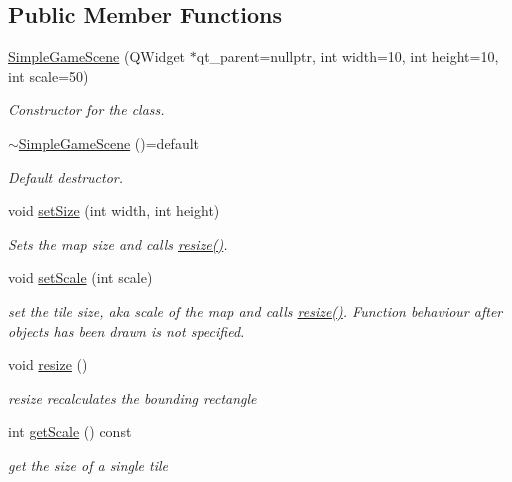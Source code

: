 \subsection*{Public Member Functions}
\begin{DoxyCompactItemize}
\item 
\hyperlink{classCourse_1_1SimpleGameScene_ae65dfd293c3490dcbb71d7a71ddda65b}{Simple\-Game\-Scene} (Q\-Widget $\ast$qt\-\_\-parent=nullptr, int width=10, int height=10, int scale=50)
\begin{DoxyCompactList}\small\item\em Constructor for the class. \end{DoxyCompactList}\item 
\hyperlink{classCourse_1_1SimpleGameScene_ab8addb19d78f539947e163d7ec37e49c}{$\sim$\-Simple\-Game\-Scene} ()=default
\begin{DoxyCompactList}\small\item\em Default destructor. \end{DoxyCompactList}\item 
void \hyperlink{classCourse_1_1SimpleGameScene_a418450a3659d632ff3ba0696ffe88adc}{set\-Size} (int width, int height)
\begin{DoxyCompactList}\small\item\em Sets the map size and calls \hyperlink{classCourse_1_1SimpleGameScene_a2a097ef678bc2eaabe93832917d2aedf}{resize()}. \end{DoxyCompactList}\item 
void \hyperlink{classCourse_1_1SimpleGameScene_a97c12ca31ae67a45b5cf3e53065c5631}{set\-Scale} (int scale)
\begin{DoxyCompactList}\small\item\em set the tile size, aka scale of the map and calls \hyperlink{classCourse_1_1SimpleGameScene_a2a097ef678bc2eaabe93832917d2aedf}{resize()}. Function behaviour after objects has been drawn is not specified. \end{DoxyCompactList}\item 
void \hyperlink{classCourse_1_1SimpleGameScene_a2a097ef678bc2eaabe93832917d2aedf}{resize} ()
\begin{DoxyCompactList}\small\item\em resize recalculates the bounding rectangle \end{DoxyCompactList}\item 
int \hyperlink{classCourse_1_1SimpleGameScene_aefad6eb4433f9e89850e96697b980831}{get\-Scale} () const 
\begin{DoxyCompactList}\small\item\em get the size of a single tile \end{DoxyCompactList}\item 

\end{DoxyCompactItemize}
